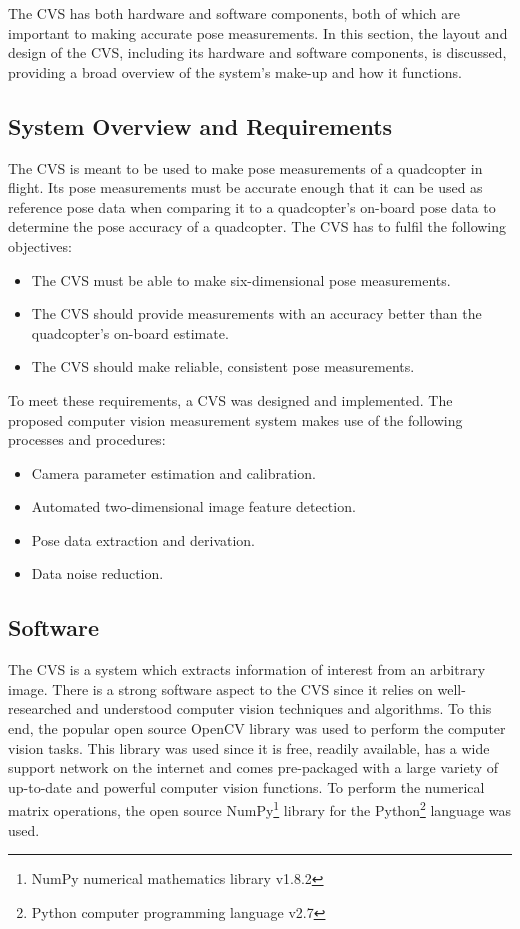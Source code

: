 The CVS has both hardware and software components, both of which are important to making accurate pose measurements. In this section, the layout and design of the CVS, including its hardware and software components, is discussed, providing a broad overview of the system's make-up and how it functions. 

\subsection{System Overview and Requirements}

The CVS is meant to be used to make pose measurements of a quadcopter in flight. Its pose measurements must be accurate enough that it can be used as reference pose data when comparing it to a quadcopter's on-board pose data to determine the pose accuracy of a quadcopter. The CVS has to fulfil the following objectives:

\begin{itemize}
  \item The CVS must be able to make six-dimensional pose measurements.
  \item The CVS should provide measurements with an accuracy better than the quadcopter's on-board estimate.
  \item The CVS should make reliable, consistent pose measurements.
\end{itemize}

To meet these requirements, a CVS was designed and implemented. The proposed computer vision measurement system makes use of the following processes and procedures: 

\begin{itemize}
  \item Camera parameter estimation and calibration.
  \item Automated two-dimensional image feature detection.
  \item Pose data extraction and derivation.
  \item Data noise reduction. 
\end{itemize}

\subsection{Software}
\label{sec:cv-sys-software}

The CVS is a system which extracts information of interest from an arbitrary image. There is a strong software aspect to the CVS since it relies on well-researched and understood computer vision techniques and algorithms. To this end, the popular open source OpenCV library was used to perform the computer vision tasks. This library was used since it is free, readily available, has a wide support network on the internet and comes pre-packaged with a large variety of up-to-date and powerful computer vision functions. To perform the numerical matrix operations, the open source NumPy\footnote{NumPy numerical mathematics library v1.8.2} library for the Python\footnote{Python computer programming language v2.7} language was used. 

